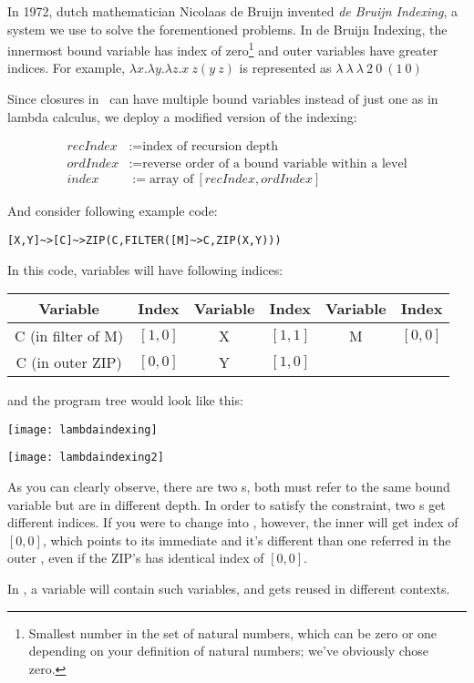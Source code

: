 In 1972, dutch mathematician Nicolaas de Bruijn invented \emph{de Bruijn Indexing}, a system we use to solve the forementioned problems. In de Bruijn Indexing, the innermost bound variable has index of zero\footnote{Smallest number in the set of natural numbers, which can be zero or one depending on your definition of natural numbers; we've obviously chose zero.} and outer variables have greater indices. For example, $\lambda x . \lambda y . \lambda z . x\ z (y\ z)$ is represented as $\lambda\ \lambda\ \lambda\ 2\ 0\ (1\ 0)$

Since closures in \tbas\ can have multiple bound variables instead of just one as in lambda calculus, we deploy a modified version of the indexing:

\begin{align*}
recIndex &:= \text{index of recursion depth}\\
ordIndex &:= \text{reverse order of a bound variable within a level}\\
index &:= \text{array of}\ [recIndex, ordIndex]
\end{align*}

And consider following example code:

\begin{lstlisting}
[X,Y]~>[C]~>ZIP(C,FILTER([M]~>C,ZIP(X,Y)))
\end{lstlisting}

In this code, variables will have following indices:

\begin{tabulary}{\textwidth}{cC|cC|cC}
Variable & Index & Variable & Index & Variable & Index \\
\hline
C {\condensedfont (in filter of M)} & $[1,0]$ & X & $[1,1]$ & M & $[0,0]$ \\
C {\condensedfont (in outer ZIP)} & $[0,0]$ & Y & $[1,0]$ & \ & \ \\
\end{tabulary}

and the program tree would look like this:

{\centering
\begin{minipage}{.5\textwidth}
  \centering
  \texttt{[image: lambdaindexing]}
  \label{fig:lambdaraw}
\end{minipage}%
\begin{minipage}{.5\textwidth}
  \centering
  \texttt{[image: lambdaindexing2]}
  \label{fig:lambdaindexed}
\end{minipage}
}

As you can clearly observe, there are two s, both must refer to the same bound variable but are in different depth. In order to satisfy the constraint, two s get different indices. If you were to change \code{[M]} into \code{[C]}, however, the inner  will get index of $[0,0]$, which points to its immediate  and it's different  than one referred in the outer , even if the ZIP's  has identical index of $[0,0]$.

In , a variable  will contain such variables, and gets reused in different contexts.
